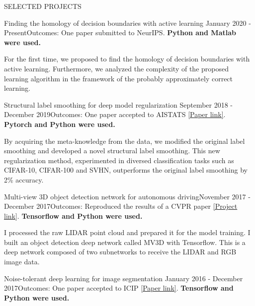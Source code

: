 \documentclass{resume} %
\begin{document}
\begin{rSection}{SELECTED PROJECTS}
\begin{rSubsection}{Finding the homology of decision boundaries with active learning} {January 2020 - Present}{Outcomes: One paper submitted to NeurIPS. \textbf{Python and Matlab were used.}}{}
\item For the first time, we proposed to find the homology of decision boundaries with active learning. Furthermore, we analyzed the complexity of the proposed learning algorithm in the framework of the probably approximately correct learning.
\end{rSubsection}  
\vspace{-0.1cm}
\begin{rSubsection}{Structural label smoothing for  deep model regularization} {September 2018 - December 2019}{Outcomes: One paper accepted to AISTATS \href{http://proceedings.mlr.press/v108/li20e/li20e.pdf}{[Paper link]}. \textbf{Pytorch and Python were used.}}{}
\item By acquiring the meta-knowledge from the data, we modified the original label smoothing and developed a novel structural label smoothing. This new regularization method, experimented in diversed classification tasks such as CIFAR-10, CIFAR-100 and SVHN, outperforms the original label smoothing by  2\% accuracy.
\end{rSubsection}  
\begin{rSubsection}{Multi-view 3D object detection network for autonomous driving}{November 2017 - December 2017}{Outcomes: Reproduced the results of a CVPR paper \href{https://github.com/wayne0908/Multi-View-3D-Object-Detection-Network-for-Autonomous-Driving}{[Project link]}. \textbf{Tensorflow and Python were used.}}{} 
\item I processed the raw LIDAR point cloud and prepared it for the model training. I built an object detection deep network called MV3D with Tensorflow. This is a deep network composed of two subnetworks to receive the LIDAR and RGB image data. \end{rSubsection}
\vspace{-0.1cm}
\begin{rSubsection}{Noise-tolerant deep learning for image segmentation} {January 2016 - December 2017}{Outcomes: One paper accepted to ICIP \href{https://ieeexplore.ieee.org/stamp/stamp.jsp?tp=&arnumber=8296848}{[Paper link]}. \textbf{Tensorflow and Python were used.}}{}

\end{rSubsection}
\end{rSection}
\end{document}
